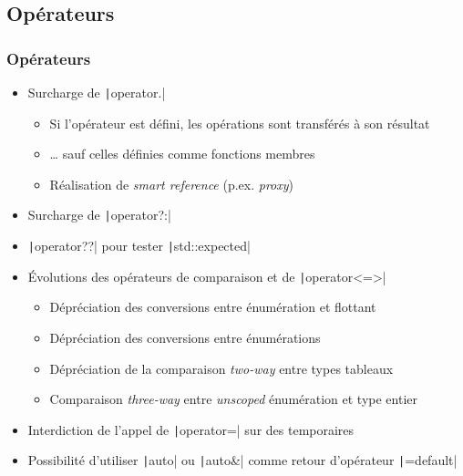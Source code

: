 \documentclass[C++.tex]{subfiles}
\begin{document}
\subsection*{Opérateurs}
\begin{frame}[fragile]
	\frametitle{Opérateurs}
	\begin{itemize}
		\item Surcharge de \texttt|operator.|
		\begin{itemize}
			\item Si l'opérateur est défini, les opérations sont transférés à son résultat
			\item \ldots{} sauf celles définies comme fonctions membres
			\item Réalisation de \textit{smart reference} (p.ex. \textit{proxy})
		\end{itemize}
		\item Surcharge de \texttt|operator?:|
		\item \texttt|operator??| pour tester \texttt|std::expected|
		\item Évolutions des opérateurs de comparaison et de \texttt|operator<=>|
		\begin{itemize}
			\item Dépréciation des conversions entre énumération et flottant
			\item Dépréciation des conversions entre énumérations
			\item Dépréciation de la comparaison \og \textit{two-way}\fg{} entre types tableaux
			\item Comparaison \textit{three-way} entre \textit{unscoped} énumération et type entier
		\end{itemize}
		\item Interdiction de l'appel de \texttt|operator=| sur des temporaires


		\item Possibilité d'utiliser \texttt|auto| ou \texttt|auto&| comme retour d'opérateur \texttt|=default|
	\end{itemize}

\end{frame}
\end{document}
